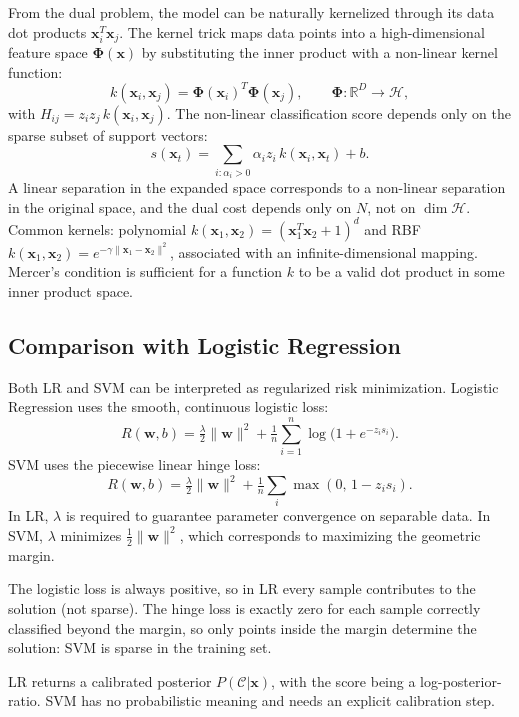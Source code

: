 From the dual problem, the model can be naturally kernelized through its data dot products $\mathbf{x}_i^T\mathbf{x}_j$. The kernel trick maps data points into a high-dimensional feature space $\boldsymbol\Phi(\mathbf{x})$ by substituting the inner product with a non-linear kernel function:
\[
k(\mathbf{x}_i,\mathbf{x}_j) = \boldsymbol\Phi(\mathbf{x}_i)^T\boldsymbol\Phi(\mathbf{x}_j), \qquad \boldsymbol\Phi:\mathbb{R}^D\to\mathcal{H},
\]
with $H_{ij}=z_iz_j\,k(\mathbf{x}_i,\mathbf{x}_j)$. The non-linear classification score depends only on the sparse subset of support vectors:
\[
s(\mathbf{x}_t) = \sum_{i:\alpha_i>0}\alpha_iz_i\,k(\mathbf{x}_i,\mathbf{x}_t)+b.
\]
A linear separation in the expanded space corresponds to a non-linear separation in the original space, and the dual cost depends only on $N$, not on $\dim\mathcal{H}$. Common kernels: polynomial $k(\mathbf{x}_1,\mathbf{x}_2)=(\mathbf{x}_1^T\mathbf{x}_2+1)^d$ and RBF $k(\mathbf{x}_1,\mathbf{x}_2)=e^{-\gamma\|\mathbf{x}_1-\mathbf{x}_2\|^2}$, associated with an infinite-dimensional mapping. Mercer's condition is sufficient for a function $k$ to be a valid dot product in some inner product space.

\subsection*{Comparison with Logistic Regression}

Both LR and SVM can be interpreted as regularized risk minimization. Logistic Regression uses the smooth, continuous logistic loss:
\[
R(\mathbf{w},b) = \tfrac{\lambda}{2}\|\mathbf{w}\|^2 + \tfrac{1}{n}\sum_{i=1}^n\log\!\big(1+e^{-z_is_i}\big).
\]
SVM uses the piecewise linear hinge loss:
\[
R(\mathbf{w},b) = \tfrac{\lambda}{2}\|\mathbf{w}\|^2 + \tfrac{1}{n}\sum_i\max(0,\,1-z_is_i).
\]
In LR, $\lambda$ is required to guarantee parameter convergence on separable data. In SVM, $\lambda$ minimizes $\frac{1}{2}\|\mathbf{w}\|^2$, which corresponds to maximizing the geometric margin.

The logistic loss is always positive, so in LR every sample contributes to the solution (not sparse). The hinge loss is exactly zero for each sample correctly classified beyond the margin, so only points inside the margin determine the solution: SVM is sparse in the training set.

LR returns a calibrated posterior $P(\mathcal{C}|\mathbf{x})$, with the score being a log-posterior-ratio. SVM has no probabilistic meaning and needs an explicit calibration step.
